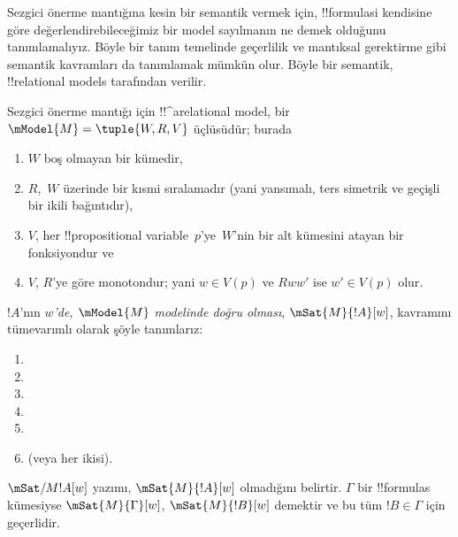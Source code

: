 \documentclass[../../../include/open-logic-section]{subfiles}
\begin{document}


Sezgici önerme mantığına kesin bir semantik vermek için, !!{formula}s{}i
kendisine göre değerlendirebileceğimiz bir model sayılmanın ne demek olduğunu
tanımlamalıyız. Böyle bir tanım temelinde geçerlilik ve mantıksal gerektirme
gibi semantik kavramları da tanımlamak mümkün olur. Böyle bir semantik,
!!{relational model}s tarafından verilir.

\begin{defn}
  Sezgici önerme mantığı için !!^a{relational model}, bir
  $\mModel{M} = \tuple{W, R, V}$ üçlüsüdür; burada
  \begin{enumerate}
  \item $W$ boş olmayan bir kümedir,
  \item $R$,~$W$ üzerinde bir kısmi sıralamadır (yani yansımalı, ters simetrik
    ve geçişli bir ikili bağıntıdır),
  \item $V$, her !!{propositional
    variable}~$p$'ye~$W$'nin bir alt kümesini
    atayan bir fonksiyondur ve
  \item $V$, $R$'ye göre monotondur; yani $w \in V(p)$ ve $Rww'$ ise
    $w' \in V(p)$ olur.
  \end{enumerate}
\end{defn}

\begin{defn}
  $!A$'nın \emph{$w$'de, $\mModel{M}$ modelinde doğru olması},
  $\mSat{M}{!A}[w]$, kavramını tümevarımlı olarak şöyle tanımlarız:
  \begin{enumerate}
  \item {}
  \item {}
  \item {}
  \item {}
  \item {}
  \item {} (veya her ikisi).
  \end{enumerate}
  $\mSat/{M}{!A}[w]$ yazımı, $\mSat{M}{!A}[w]$ olmadığını belirtir. $\Gamma$
  bir !!{formula}s kümesiyse $\mSat{M}{\Gamma}[w]$, $\mSat{M}{!B}[w]$
  demektir ve bu tüm $!B \in \Gamma$ için geçerlidir.
\end{defn}
\end{document}

